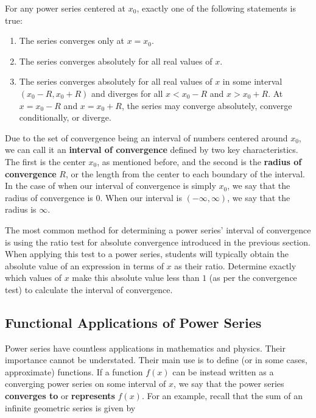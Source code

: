 \documentclass[11pt]{article}
\begin{document}
\begin{center}
For any power series centered at $x_0$, exactly one of the following statements is true:
\begin{enumerate}
    \item The series converges only at $x=x_0$.
    \item The series converges absolutely for all real values of $x$.
    \item The series converges absolutely for all real values of $x$ in some interval $(x_0-R, x_0+R)$ and diverges for all $x<x_0-R$ and $x>x_0+R$. At $x=x_0-R$ and $x=x_0+R$, the series may converge absolutely, converge conditionally, or diverge. 
\end{enumerate}
\end{center}
\vspace{0.5 cm}

Due to the set of convergence being an interval of numbers centered around $x_0$, we can call it an \textbf{interval of convergence} defined by two key characteristics. The first is the center $x_0$, as mentioned before, and the second is the \textbf{radius of convergence} $R$, or the length from the center to each boundary of the interval. In the case of when our interval of convergence is simply $x_0$, we say that the radius of convergence is $0$. When our interval is $(-\infty, \infty)$, we say that the radius is $\infty$.

The most common method for determining a power series' interval of convergence is using the ratio test for absolute convergence introduced in the previous section. When applying this test to a power series, students will typically obtain the absolute value of an expression in terms of $x$ as their ratio. Determine exactly which values of $x$ make this absolute value less than $1$ (as per the convergence test) to calculate the interval of convergence.


\subsection{Functional Applications of Power Series}
Power series have countless applications in mathematics and physics. Their importance cannot be understated. Their main use is to define (or in some cases, approximate) functions. If a function $f(x)$ can be instead written as a converging power series on some interval of $x$, we say that the power series \textbf{converges to} or \textbf{represents} $f(x)$. For an example, recall that the sum of an infinite geometric series is given by 
\end{document}
